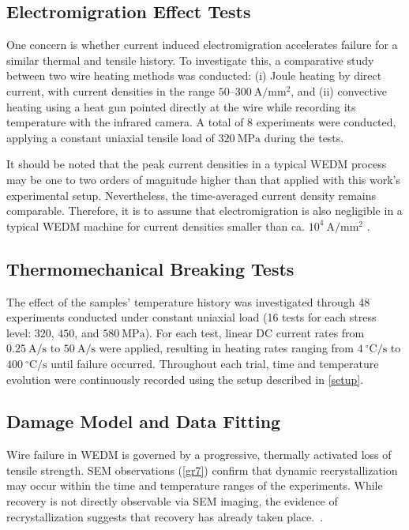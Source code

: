 \documentclass[5p,times,procedia]{elsarticle}
\begin{document}
\subsection{Electromigration Effect Tests}

One concern is whether current induced electromigration accelerates failure for a similar thermal and tensile history. To investigate this, a comparative study between two wire heating methods was conducted: (i) Joule heating by direct current, with current densities in the range $50$--$300~\mathrm{A/mm^2}$, and (ii) convective heating using a heat gun pointed directly at the wire while recording its temperature with the infrared camera. A total of 8 experiments were conducted, applying a constant uniaxial tensile load of $320~\mathrm{MPa}$ during the tests. 

It should be noted that the peak current densities in a typical WEDM process may be one to two orders of magnitude higher than that applied with this work's experimental setup. Nevertheless, the time-averaged current density remains comparable. Therefore, it is to assume that electromigration is also negligible in a typical WEDM machine for current densities smaller than ca. $10^4~\mathrm{A/mm^2}$ \cite{ho1989}.

\subsection{Thermomechanical Breaking Tests}

The effect of the samples' temperature history was investigated through 48 experiments conducted under constant uniaxial load (16 tests for each stress level: $320$, $450$, and $580~\mathrm{MPa}$). For each test, linear DC current rates from $0.25~\mathrm{A/s}$ to $50~\mathrm{A/s}$  were applied, resulting in heating rates ranging from $4~\mathrm{^\circ C/s}$ to $400~\mathrm{^\circ C/s}$ until failure occurred. Throughout each trial, time and temperature evolution were continuously recorded using the setup described in \autoref{setup}.


\subsection{Damage Model and Data Fitting}\label{model}

Wire failure in WEDM is governed by a progressive, thermally activated loss of tensile strength. SEM observations (\autoref{gr7}) confirm that dynamic recrystallization may occur within the time and temperature ranges of the experiments. While recovery is not directly observable via SEM imaging, the evidence of recrystallization suggests that recovery has already taken place.~\cite{humphreys2017}.
\end{document}
